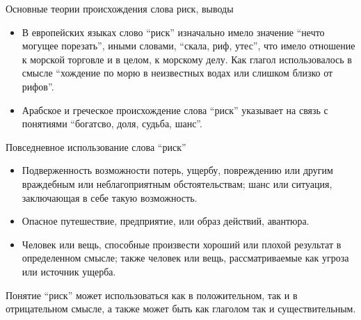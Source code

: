 \documentclass[_fin_decisions_lectures.tex]{subfiles}
\begin{document}
\begin{frame}{Основные теории происхождения слова риск, выводы}
\begin{itemize}
\item
В европейских языках слово ``риск'' изначально имело значение ``нечто могущее порезать'', иными словами, ``скала, риф, утес'', что имело отношение к морской торговле и в целом, к морскому делу. Как глагол использовалось в смысле ``хождение по морю в неизвестных водах или слишком близко от рифов''.
\item
Арабское и греческое происхождение слова ``риск'' указывает на связь с понятиями ``богатсво, доля, судьба, шанс''.

\end{itemize}
\end{frame}
\begin{frame}[shrink=10]{Повседневное использование слова ``риск''}
\begin{itemize}
\item
Подверженность возможности потерь, ущербу, повреждению или другим враждебным или неблагоприятным обстоятельствам; шанс или ситуация, заключающая в себе такую возможность.
\item
Опасное путешествие, предприятие, или образ действий, авантюра.
\item
Человек или вещь, способные произвести хороший или плохой результат в определенном смысле; также человек или вещь, рассматриваемые как угроза или источник ущерба.
\end{itemize}
Понятие ``риск'' может использоваться как в положительном, так и в отрицательном смысле, а также может быть как глаголом так и существительным.
\end{frame}
\end{document}
